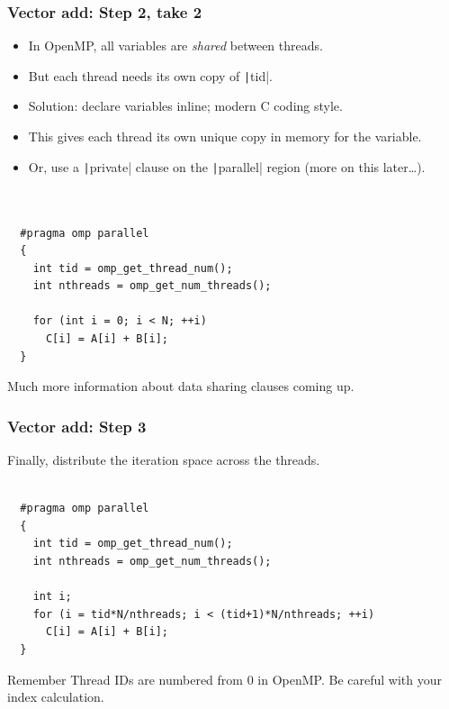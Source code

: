 \documentclass[aspectratio=169]{beamer}
\begin{document}
\begin{frame}[fragile]
\frametitle{Vector add: Step 2, take 2}

\begin{itemize}
  \item In OpenMP, all variables are \emph{shared} between threads.
  \item But each thread needs its own copy of \texttt|tid|.
  \item Solution: declare variables inline; modern C coding style.
  \item This gives each thread its own unique copy in memory for the variable.
  \item Or, use a \texttt|private| clause on the \texttt|parallel| region (more on this later\dots).
\end{itemize}

\begin{verbatim}


  #pragma omp parallel
  {
    int tid = omp_get_thread_num();
    int nthreads = omp_get_num_threads();

    for (int i = 0; i < N; ++i)
      C[i] = A[i] + B[i];
  }
\end{verbatim}
Much more information about data sharing clauses coming up.
\end{frame}

\begin{frame}[fragile]
\frametitle{Vector add: Step 3}
Finally, distribute the iteration space across the threads.
\begin{verbatim}

  #pragma omp parallel
  {
    int tid = omp_get_thread_num();
    int nthreads = omp_get_num_threads();

    int i;
    for (i = tid*N/nthreads; i < (tid+1)*N/nthreads; ++i)
      C[i] = A[i] + B[i];
  }
\end{verbatim}
\begin{block}{Remember}
Thread IDs are numbered from 0 in OpenMP.
Be careful with your index calculation.
\end{block}
\end{frame}

\end{document}
